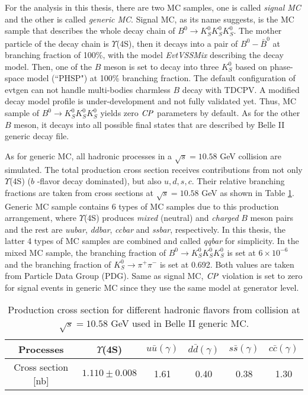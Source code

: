  For the analysis in this thesis, there are two MC samples, one is called \textit{signal MC} and the other is called \textit{generic MC}. Signal MC, as its name suggests, is the MC sample that describes the whole decay chain of $B^0 \to K_S^0  K_S^0  K_S^0$. The mother particle of the decay chain is $\Upsilon$(4S), then it decays into a pair of $B^0-\bar{B}^0$ at branching fraction of 100\%, with the model \textit{EvtVSSMix}\cite{evtgen} describing the decay model. Then, one of the $B$ meson is set to decay into three $K_S^0$ based on phase-space model (``PHSP") at 100\% branching fraction. The default configuration of evtgen can not handle multi-bodies charmless $B$ decay with TDCPV. A modified decay model profile is under-development and not fully validated yet. Thus, MC sample of $B^0 \to K_S^0  K_S^0  K_S^0$ yields zero $\it{CP}$ parameters by default. As for the other $B$ meson, it decays into all possible final states that are described by Belle II generic decay file. 
 
 As for generic MC, all hadronic processes in a  $\sqrt{s} = 10.58 $ GeV collision are simulated. The total production cross section receives contributions from not only $\Upsilon$(4S) ($b$ -flavor decay dominated), but also $u, d, s, c$. 
 Their relative branching fractions are taken from cross sections at  $\sqrt{s} = 10.58 $ GeV as shown in Table \ref{tab:generic_br}. Generic MC sample contains 6 types of MC samples due to this production arrangement, where $\Upsilon$(4S) produces \textit{mixed} (neutral) and \textit{charged} $B$ meson pairs and the rest are \textit{uubar}, \textit{ddbar}, \textit{ccbar} and \textit{ssbar}, respectively. In this thesis, the latter 4 types of MC samples are combined and called \textit{qqbar} for simplicity. In the mixed MC sample, the branching fraction of $B^0 \to K_S^0  K_S^0  K_S^0$ is set at $6 \times 10^{-6}$ and the branching fraction of $K_S^0 \to \pi^{+}\pi^{-}$ is set at 0.692. Both values are taken from Particle Data Group (PDG)\cite{pdg}. Same as signal MC, $\it{CP}$ violation is set to zero for signal events in generic MC since they use the same model at generator level.
 
 \begin{table}
 	\caption{Production cross section for different hadronic flavors from collision at  $\sqrt{s} = 10.58 $ GeV used in Belle II generic MC.\cite{b2book}}
 	\label{tab:generic_br}
 	\centering
 	\begin{tabular}{c|c|c|c|c|c}
 		\hline 
 	Processes & $\Upsilon$(4S) & $u\bar{u}(\gamma)$ & $d\bar{d}(\gamma)$ & $s\bar{s}(\gamma)$ & $c\bar{c}(\gamma)$ \\
 		\hline 
 	Cross section [nb] & $1.110\pm0.008$ & 1.61 & 0.40 & 0.38 & 1.30 \\
 	\hline
 	\end{tabular}
 \end{table}
 
